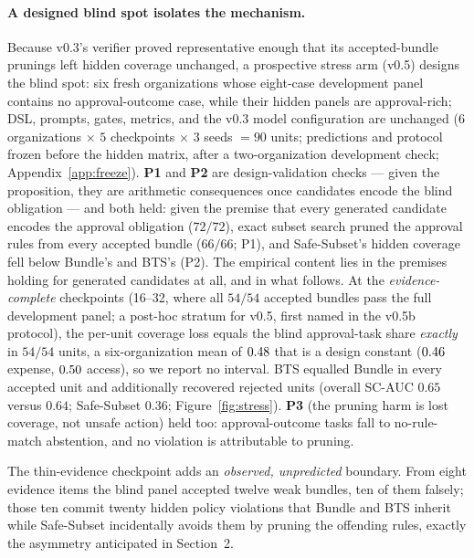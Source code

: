 \documentclass{article}
\begin{document}
\paragraph{A designed blind spot isolates the mechanism.}
Because v0.3's verifier proved representative enough that its \PrunedPassingUnits{} accepted-bundle prunings left hidden coverage unchanged, a prospective stress arm (v0.5) designs the blind spot: six fresh organizations whose eight-case development panel contains no approval-outcome case, while their hidden panels are approval-rich; DSL, prompts, gates, metrics, and the v0.3 model configuration are unchanged ($6$ organizations $\times$ $5$ checkpoints $\times$ $3$ seeds $=90$ units; predictions and protocol frozen before the hidden matrix, after a two-organization development check; Appendix~\ref{app:freeze}). \textbf{P1} and \textbf{P2} are design-validation checks --- given the proposition, they are arithmetic consequences once candidates encode the blind obligation --- and both held: given the premise that every generated candidate encodes the approval obligation ($72/72$), exact subset search pruned the approval rules from every accepted bundle ($66/66$; P1), and Safe-Subset's hidden coverage fell below Bundle's and BTS's (P2). The empirical content lies in the premises holding for generated candidates at all, and in what follows. At the \emph{evidence-complete} checkpoints (16--32, where all $54/54$ accepted bundles pass the full development panel; a post-hoc stratum for v0.5, first named in the v0.5b protocol), the per-unit coverage loss equals the blind approval-task share \emph{exactly} in $54/54$ units, a six-organization mean of $0.48$ that is a design constant ($0.46$ expense, $0.50$ access), so we report no interval. BTS equalled Bundle in every accepted unit and additionally recovered rejected units (overall SC-AUC $0.65$ versus $0.64$; Safe-Subset $0.36$; Figure~\ref{fig:stress}). \textbf{P3} (the pruning harm is lost coverage, not unsafe action) held too: approval-outcome tasks fall to no-rule-match abstention, and no violation is attributable to pruning.

The thin-evidence checkpoint adds an \emph{observed, unpredicted} boundary. From eight evidence items the blind panel accepted twelve weak bundles, ten of them falsely; those ten commit twenty hidden policy violations that Bundle and BTS inherit while Safe-Subset incidentally avoids them by pruning the offending rules, exactly the asymmetry anticipated in Section~2.
\end{document}
